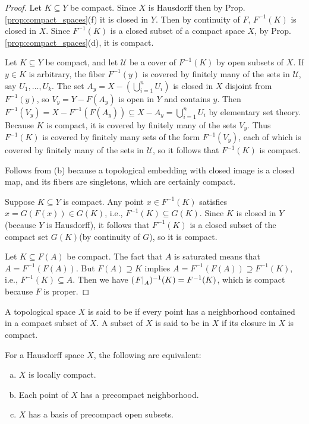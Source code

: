 \documentclass[11pt,a4paper]{article}
\begin{document}
\begin{proof}
 Let $K\subseteq Y$ be compact. Since $X$ is Hausdorff then by Prop. \ref{prop:compact_spaces}(f) it is closed in $Y$. Then by continuity of $F$, $F^{-1}(K)$ is closed in $X$. Since $F^{-1}(K)$ is a closed subset of a compact space $X$, by Prop. \ref{prop:compact_spaces}(d), it is compact.

 Let $K\subseteq Y$ be compact, and let $\mathcal{U}$ be a cover of $F^{-1}(K)$ by open subsets of $X$. If $y\in K$ is arbitrary, the fiber $F^{-1}(y)$ is covered by finitely many of the sets in $\mathcal{U}$, say $U_1,\ldots,U_k$. The set $A_y = X-(\bigcup_{i=1}^n U_i)$ is closed in $X$ disjoint from $F^{-1}(y)$, so $V_y = Y-F(A_y)$ is open in $Y$ and contains $y$. Then $F^{-1}(V_y) = X - F^{-1}(F(A_y))\subseteq X-A_y = \bigcup_{i=1}^n U_i$ by elementary set theory. Because $K$ is compact, it is covered by finitely many of the sets $V_y$. Thus $F^{-1}(K)$ is covered by finitely many sets of the form $F^{-1}(V_y)$, each of which is covered by finitely many of the sets in $\mathcal{U}$, so it follows that $F^{-1}(K)$ is compact.

 Follows from (b) because a topological embedding with closed image is a closed map, and its fibers are singletons, which are certainly compact.

 Suppose $K\subseteq Y$ is compact. Any point $x\in F^{-1}(K)$ satisfies $x = G(F(x))\in G(K)$, i.e., $F^{-1}(K)\subseteq G(K)$. Since $K$ is closed in $Y$ (because $Y$ is Hausdorff), it follows that $F^{-1}(K)$ is a closed subset of the compact set $G(K)$(by continuity of $G$), so it is compact.

 Let $K\subseteq F(A)$ be compact. The fact that $A$ is saturated means that $A = F^{-1}(F(A))$. But $F(A)\supseteq K$ implies $A = F^{-1}(F(A))\supseteq F^{-1}(K)$, i.e., $F^{-1}(K)\subseteq A$. Then we have $(\left.F\right|_{A})^{-1}(K) = F^{-1}(K)$, which is compact because $F$ is proper.
\end{proof}

\begin{definition}
A topological space $X$ is said to be  if every point has a neighborhood contained in a compact subset of $X$. A subset of $X$ is said to be  in $X$ if its closure in $X$ is compact.
\end{definition}

\begin{proposition}
For a Hausdorff space $X$, the following are equivalent:
\begin{enumerate}[(a)]
    \item $X$ is locally compact.
    \item Each point of $X$ has a precompact neighborhood.
    \item $X$ has a basis of precompact open subsets.
\end{enumerate}
\end{proposition}
\end{document}
